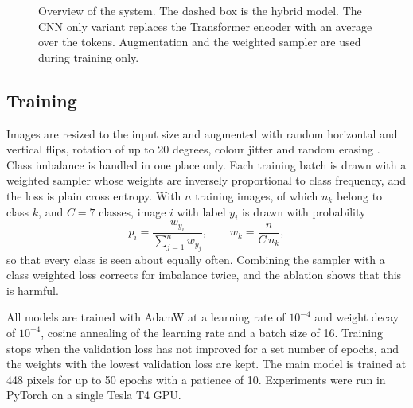 \documentclass[runningheads]{llncs}
\begin{document}
\begin{figure}[!htbp]
\caption{Overview of the system. The dashed box is the hybrid model. The CNN only variant replaces the Transformer encoder with an average over the tokens. Augmentation and the weighted sampler are used during training only.}
\label{fig:arch}
\end{figure}

\subsection{Training}

Images are resized to the input size and augmented with random horizontal and vertical flips, rotation of up to 20 degrees, colour jitter and random erasing \cite{zhong2020}. Class imbalance is handled in one place only. Each training batch is drawn with a weighted sampler whose weights are inversely proportional to class frequency, and the loss is plain cross entropy. With $n$ training images, of which $n_k$ belong to class $k$, and $C = 7$ classes, image $i$ with label $y_i$ is drawn with probability
\begin{equation}
p_i = \frac{w_{y_i}}{\sum_{j=1}^{n} w_{y_j}}, \qquad w_k = \frac{n}{C\, n_k},
\label{eq:sampler}
\end{equation}
so that every class is seen about equally often. Combining the sampler with a class weighted loss corrects for imbalance twice, and the ablation shows that this is harmful.

All models are trained with AdamW \cite{loshchilov2019} at a learning rate of $10^{-4}$ and weight decay of $10^{-4}$, cosine annealing of the learning rate \cite{loshchilov2017} and a batch size of 16. Training stops when the validation loss has not improved for a set number of epochs, and the weights with the lowest validation loss are kept. The main model is trained at 448 pixels for up to 50 epochs with a patience of 10. Experiments were run in PyTorch \cite{paszke2019} on a single Tesla T4 GPU.
\end{document}
